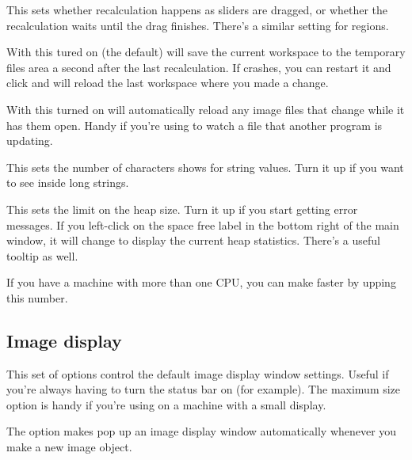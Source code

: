 \begin{description}
This sets whether recalculation happens as sliders are dragged, or whether the
recalculation waits until the drag finishes. There's a similar setting for
regions.

\item[\ct{Auto workspace save}]

With this tured on (the default) \nip{} will save the current workspace to
the temporary files area a second after the last recalculation. If \nip{}
crashes, you can restart it and click  and \nip{} will reload the last workspace where you made a change.

\item[\ct{Auto-reload on file change}]

With this turned on \nip{} will automatically reload any image files that
change while it has them open. Handy if you're using \nip{} to watch a file
that another program is updating.

\item[\ct{Maximum text display}]

This sets the number of characters \nip{} shows for string values. Turn it up
if you want to see inside long strings.

\item[\ct{Maximum heap}]

This sets the limit on the heap size. Turn it up if you start getting  error messages. If you left-click on the space free label in the bottom
right of the main window, it will change to display the current heap
statistics. There's a useful tooltip as well.

\item[\ct{Number of CPUs to use}]

If you have a machine with more than one CPU, you can make \nip{} faster by
upping this number.

\end{description}

\subsection{Image display}

This set of options control the default image display window settings. Useful
if you're always having to turn the status bar on (for example). The maximum
size option is handy if you're using \nip{} on a machine with a small display.

The  option makes \nip{} pop up an image display window 
automatically whenever you make a new image object.

